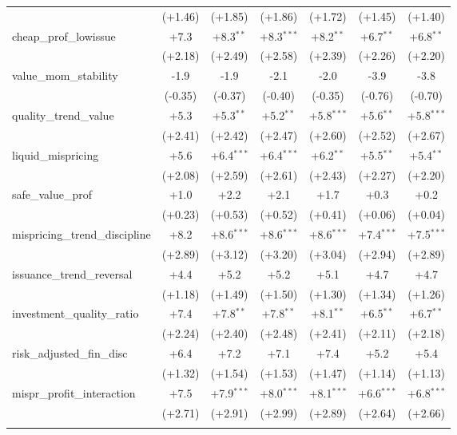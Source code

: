\begin{table}[htbp]
\begin{threeparttable}
\begin{tabular}{lcccccc}
 & (+1.46) & (+1.85) & (+1.86) & (+1.72) & (+1.45) & (+1.40) \\
\addlinespace
cheap\_prof\_lowissue & +7.3 & +8.3$^{**}$ & +8.3$^{***}$ & +8.2$^{**}$ & +6.7$^{**}$ & +6.8$^{**}$ \\
 & (+2.18) & (+2.49) & (+2.58) & (+2.39) & (+2.26) & (+2.20) \\
\addlinespace
value\_mom\_stability & -1.9 & -1.9 & -2.1 & -2.0 & -3.9 & -3.8 \\
 & (-0.35) & (-0.37) & (-0.40) & (-0.35) & (-0.76) & (-0.70) \\
\addlinespace
quality\_trend\_value & +5.3 & +5.3$^{**}$ & +5.2$^{**}$ & +5.8$^{***}$ & +5.6$^{**}$ & +5.8$^{***}$ \\
 & (+2.41) & (+2.42) & (+2.47) & (+2.60) & (+2.52) & (+2.67) \\
\addlinespace
liquid\_mispricing & +5.6 & +6.4$^{***}$ & +6.4$^{***}$ & +6.2$^{**}$ & +5.5$^{**}$ & +5.4$^{**}$ \\
 & (+2.08) & (+2.59) & (+2.61) & (+2.43) & (+2.27) & (+2.20) \\
\addlinespace
safe\_value\_prof & +1.0 & +2.2 & +2.1 & +1.7 & +0.3 & +0.2 \\
 & (+0.23) & (+0.53) & (+0.52) & (+0.41) & (+0.06) & (+0.04) \\
\addlinespace
mispricing\_trend\_discipline & +8.2 & +8.6$^{***}$ & +8.6$^{***}$ & +8.6$^{***}$ & +7.4$^{***}$ & +7.5$^{***}$ \\
 & (+2.89) & (+3.12) & (+3.20) & (+3.04) & (+2.94) & (+2.89) \\
\addlinespace
issuance\_trend\_reversal & +4.4 & +5.2 & +5.2 & +5.1 & +4.7 & +4.7 \\
 & (+1.18) & (+1.49) & (+1.50) & (+1.30) & (+1.34) & (+1.26) \\
\addlinespace
investment\_quality\_ratio & +7.4 & +7.8$^{**}$ & +7.8$^{**}$ & +8.1$^{**}$ & +6.5$^{**}$ & +6.7$^{**}$ \\
 & (+2.24) & (+2.40) & (+2.48) & (+2.41) & (+2.11) & (+2.18) \\
\addlinespace
risk\_adjusted\_fin\_disc & +6.4 & +7.2 & +7.1 & +7.4 & +5.2 & +5.4 \\
 & (+1.32) & (+1.54) & (+1.53) & (+1.47) & (+1.14) & (+1.13) \\
\addlinespace
mispr\_profit\_interaction & +7.5 & +7.9$^{***}$ & +8.0$^{***}$ & +8.1$^{***}$ & +6.6$^{***}$ & +6.8$^{***}$ \\
 & (+2.71) & (+2.91) & (+2.99) & (+2.89) & (+2.64) & (+2.66) \\
\addlinespace

\end{tabular}
\end{threeparttable}
\end{table}
